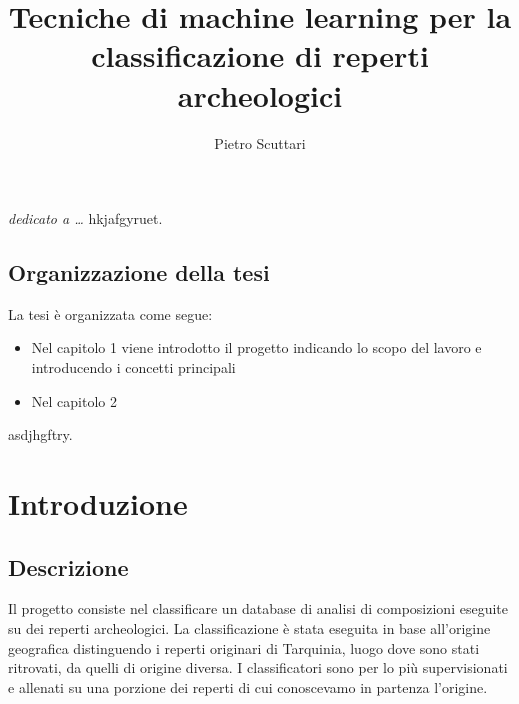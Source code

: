 \documentclass[a4paper,12pt]{report}
\begin{document}
\title{Tecniche di machine learning per la classificazione di reperti archeologici}
\author{Pietro Scuttari}
%
% 
%
\beforepreface
\prefacesection{}
		{\hfill \Large {\sl dedicato a \dots}}
% 
%
hkjafgyruet.
%
%
\section{Organizzazione della tesi}
\label{organizzazione}
La tesi \`e organizzata come segue:
\begin{itemize}
	\item Nel capitolo 1 viene introdotto il progetto indicando lo scopo del lavoro e 
introducendo i concetti principali
	\item Nel capitolo 2 

\end{itemize}
%
%
asdjhgftry.
\afterpreface
% 
% 
\chapter{Introduzione}
\label{cap1}
\section{Descrizione}
Il progetto consiste nel classificare un database di analisi di composizioni eseguite
su dei reperti archeologici. La classificazione è stata eseguita in base all'origine
geografica distinguendo i reperti originari di Tarquinia, luogo dove sono stati 
ritrovati, da quelli di origine diversa. I classificatori sono per lo più 
supervisionati e allenati su una porzione dei reperti di cui conoscevamo in partenza
l'origine.
\end{document}
